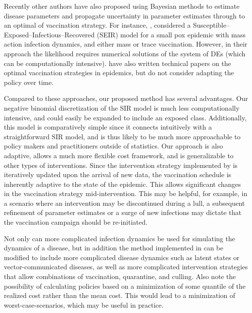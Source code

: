 \documentclass[shortnames,nojss]{jss}
\begin{document}
Recently other authors \citep[e.g.,][]{elderd06} have also proposed
using Bayesian methods to estimate disease parameters and propagate
uncertainty in parameter estimates through to an optimal of
vaccination strategy. For instance, \citet{elderd06},
considered a Susceptible--Exposed--Infectious--Recovered (SEIR) model
for a small pox epidemic with mass action infection dynamics, and
either mass or trace vaccination. However, in their approach
the likelihood requires numerical solutions of the system of DEs (which
can be computationally intensive).
\citet{ball02,ball07} have also written technical papers
on the optimal vaccination strategies in epidemics, but do not
consider adapting the policy over time. %

Compared to these approaches, our proposed method has several
advantages.  Our negative binomial discretization of the SIR model is
much less computationally intensive, and could easily be expanded to
include an exposed class. Additionally, this model is comparatively
simple since it connects intuitively with a straightforward SIR model,
and is thus likely to be much more approachable to policy makers and
practitioners outside of statistics. Our approach is also adaptive,
allows a much more flexible cost framework, and is generalizable to
other types of interventions.  Since the intervention strategy
implemented by  is iteratively updated upon the arrival of
new data, the vaccination schedule is inherently adaptive to the state
of the epidemic.  This allows significant changes in the vaccination
strategy mid-intervention.  This may be helpful, for example, in a
scenario where an intervention may be discontinued during a lull, a
subsequent refinement of parameter estimates or a surge of new
infections may dictate that the vaccination campaign should be
re-initiated.

Not only can more complicated infection dynamics be used for simulating
the dynamics of a disease, but in addition the method implemented in
 can be modified to include more complicated disease
dynamics such as latent states or vector-communicated diseases, as
well as more complicated intervention strategies that allow
combinations of vaccination, quarantine, and culling.  Also note the
possibility of calculating policies based on a minimization of some
quantile of the realized cost rather than the mean cost.  This would
lead to a minimization of worst-case-scenarios, which may be useful in
practice.
\end{document}
